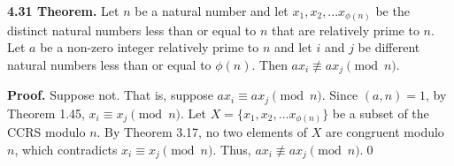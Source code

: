 \documentclass[12pt]{article}
\begin{document}
\noindent\textbf{4.31 Theorem.} Let $n$ be a natural number and let $x_1,x_2,...x_{\phi(n)}$ be the distinct natural numbers less than or equal to $n$ that are relatively prime to $n$. Let $a$ be a non-zero integer relatively prime to $n$ and let $i$ and $j$ be different natural numbers less than or equal to $\phi(n)$. Then $ax_i\not\equiv ax_j\pmod n$.

\bigskip

\noindent\textbf{Proof.} Suppose not. That is, suppose $ax_i\equiv ax_j\pmod n$. Since $(a,n)=1$, by Theorem 1.45, $x_i\equiv x_j\pmod n$. Let $X=\{x_1,x_2,...x_{\phi(n)}\}$ be a subset of the CCRS modulo $n$. By Theorem 3.17, no two elements of $X$ are congruent modulo $n$, which contradicts $x_i\equiv x_j\pmod n$. Thus, $ax_i\not\equiv ax_j\pmod n$.\qed 
\end{document}
